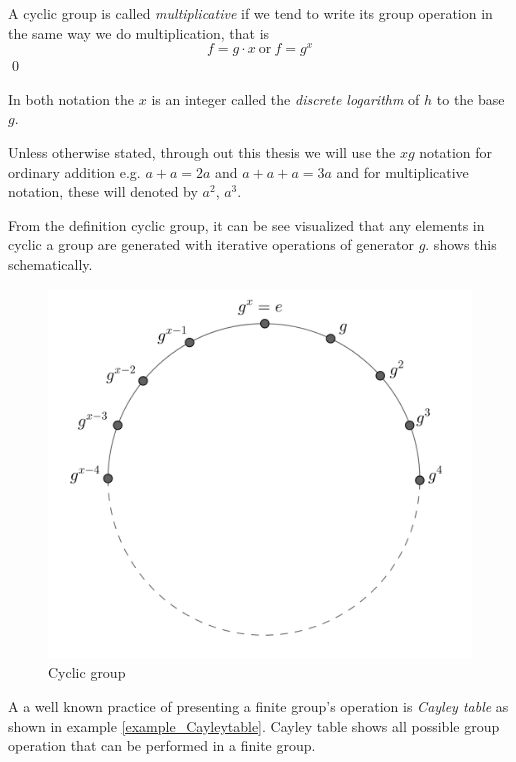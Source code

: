 \begin{definition}
	A cyclic group is called \textit{multiplicative} if we tend to write its group operation in the same way we do multiplication, that is 
	$$f =  g \cdot x ~\text{or}~ f = g^x$$ 
	\qed
\end{definition}

\begin{remark}
	In both notation the $x$  is an integer called the \textit{discrete logarithm} of $h$ to the base $g$.
\end{remark}
\begin{remark}
	Unless otherwise stated, through out this thesis we will use the $xg$ notation for ordinary addition e.g. $a+a=2a$ and $a+a+a=3a$ and for multiplicative notation, these will denoted by $a^2$, $a^3$.
\end{remark}

From the definition cyclic group, it can be see visualized that any elements in cyclic a group are generated with iterative operations of generator $g$. 
 shows this schematically.
\begin{figure}[h]
\begin{center}
	\includegraphics[width=.6\linewidth, height=.67\textheight, keepaspectratio]{Figures/cyclicgroup}
\caption{Cyclic group}
\label{Cyclic group}
\end{center}
\end{figure}

A a well known practice of presenting a finite group's operation is {\em Cayley table} as shown in example \ref{example_Cayleytable}.
Cayley table shows all possible group operation that can be performed in a finite group.

